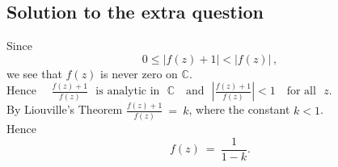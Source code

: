 \documentclass{amsart}
\newcommand{\ds}[1]{\displaystyle{#1}}
\begin{document}
\subsection*{Solution to the extra question}
Since $$0 \leq |f(z) + 1|< |f(z)| \, ,$$ we see that $f(z)$ is never zero on $\mathbb{C}$. \bigskip \\ Hence
 $\quad \ds{ \frac{f(z)+1}{f(z)}} \mbox{~~is analytic in~~} \mathbb{C} \mbox{~~ and~~} \ds{\left|\frac{f(z) +1}{f(z)} \right| < 1} \mbox{~~ for all~~}z$. \bigskip \\

By Liouville's Theorem $\ds{\frac{f(z) +1}{f(z)} } ~=~ k$, where the constant $k<1$. \medskip \\

Hence $$f(z) ~=~ \frac{1}{1-k}. $$
\end{document}
